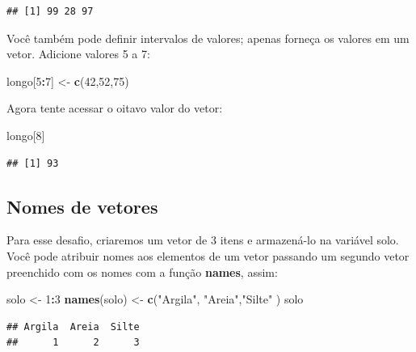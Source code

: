\documentclass[]{book}
\newenvironment{Shaded}{\begin{snugshade}}{\end{snugshade}}
\newcommand{\DecValTok}[1]{\textcolor[rgb]{0.00,0.00,0.81}{#1}}
\newcommand{\KeywordTok}[1]{\textcolor[rgb]{0.13,0.29,0.53}{\textbf{#1}}}
\newcommand{\NormalTok}[1]{#1}
\newcommand{\OperatorTok}[1]{\textcolor[rgb]{0.81,0.36,0.00}{\textbf{#1}}}
\newcommand{\StringTok}[1]{\textcolor[rgb]{0.31,0.60,0.02}{#1}}
\begin{document}
\begin{verbatim}
## [1] 99 28 97
\end{verbatim}

Você também pode definir intervalos de valores; apenas forneça os valores em um vetor. Adicione valores 5 a 7:

\begin{Shaded}
\begin{Highlighting}[]
\NormalTok{longo[}\DecValTok{5}\OperatorTok{:}\DecValTok{7}\NormalTok{] <-}\StringTok{ }\KeywordTok{c}\NormalTok{(}\DecValTok{42}\NormalTok{,}\DecValTok{52}\NormalTok{,}\DecValTok{75}\NormalTok{)}
\end{Highlighting}
\end{Shaded}

Agora tente acessar o oitavo valor do vetor:

\begin{Shaded}
\begin{Highlighting}[]
\NormalTok{longo[}\DecValTok{8}\NormalTok{]}
\end{Highlighting}
\end{Shaded}

\begin{verbatim}
## [1] 93
\end{verbatim}

\hypertarget{nomes-de-vetores}{%
\subsection{Nomes de vetores}\label{nomes-de-vetores}}

Para esse desafio, criaremos um vetor de 3 itens e armazená-lo na variável solo.
Você pode atribuir nomes aos elementos de um vetor passando um segundo vetor preenchido com os nomes com a função \textbf{names}, assim:

\begin{Shaded}
\begin{Highlighting}[]
\NormalTok{solo <-}\StringTok{ }\DecValTok{1}\OperatorTok{:}\DecValTok{3}
\KeywordTok{names}\NormalTok{(solo) <-}\StringTok{ }\KeywordTok{c}\NormalTok{(}\StringTok{"Argila"}\NormalTok{, }\StringTok{"Areia"}\NormalTok{,}\StringTok{"Silte"}\NormalTok{ )}
\NormalTok{solo}
\end{Highlighting}
\end{Shaded}

\begin{verbatim}
## Argila  Areia  Silte 
##      1      2      3
\end{verbatim}
\end{document}
